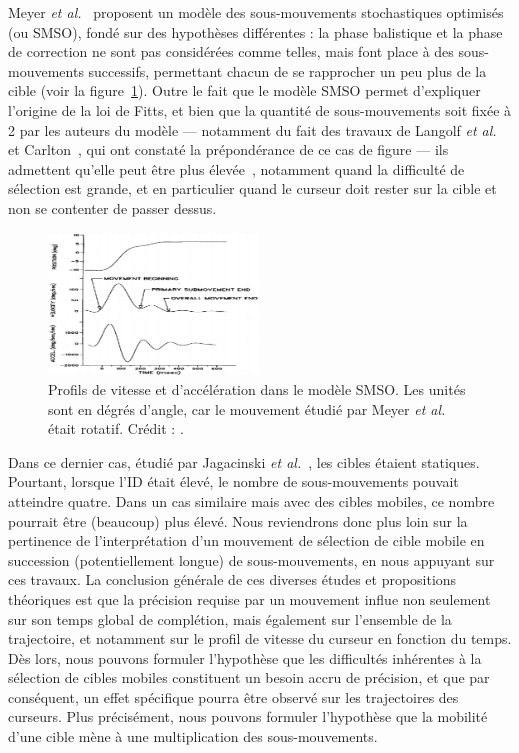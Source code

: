 	\label{sub:smso}
	Meyer \emph{et al.}~\cite{meyer1988optimality} proposent un modèle des \og sous-mouvements stochastiques optimisés \fg{} (ou SMSO), fondé sur des hypothèses différentes : la phase balistique et la phase de correction ne sont pas considérées comme telles, mais font place à des sous-mouvements successifs, permettant chacun de se rapprocher un peu plus de la cible (voir la figure~\ref{fig:meyer}). Outre le fait que le modèle SMSO permet d'expliquer l'origine de la loi de Fitts, et bien que la quantité de sous-mouvements soit fixée à 2 par les auteurs du modèle --- notamment du fait des travaux de Langolf \emph{et al.}~\cite{langolf1976investigation} et Carlton~\cite{carlton1979control}, qui ont constaté la prépondérance de ce cas de figure --- ils admettent qu'elle peut être plus élevée~\cite{crossman1963feedback, crossman1983feedback}, notamment quand la difficulté de sélection est grande, et en particulier quand le curseur doit rester sur la cible et non se contenter de passer dessus.
	
	\begin{figure}
		\centering
		\includegraphics[width=0.5\textwidth]{figures/ch2/meyer}
		\caption[Profils de vitesse et d'accélération dans le modèle SMSO]{Profils de vitesse et d'accélération dans le modèle SMSO. Les unités sont en dégrés d'angle, car le mouvement étudié par Meyer \emph{et al.} était rotatif. Crédit : \cite{meyer1988optimality}.}
		\label{fig:meyer}
	\end{figure}
	
	Dans ce dernier cas, étudié par Jagacinski \emph{et al.}~\cite{jagacinski1980fitts}, les cibles étaient statiques. Pourtant, lorsque l'ID était élevé, le nombre de sous-mouvements pouvait atteindre quatre. Dans un cas similaire mais avec des cibles mobiles, ce nombre pourrait être (beaucoup) plus élevé. Nous reviendrons donc plus loin sur la pertinence de l'interprétation d'un mouvement de sélection de cible mobile en succession (potentiellement longue) de sous-mouvements, en nous appuyant sur ces travaux. La conclusion générale de ces diverses études et propositions théoriques est que la précision requise par un mouvement influe non seulement sur son temps global de complétion, mais également sur l'ensemble de la trajectoire, et notamment sur le profil de vitesse du curseur en fonction du temps. Dès lors, nous pouvons formuler l'hypothèse que les difficultés inhérentes à la sélection de cibles mobiles constituent un besoin accru de précision, et que par conséquent, un effet spécifique pourra être observé sur les trajectoires des curseurs. Plus précisément, nous pouvons formuler l'hypothèse que la mobilité d'une cible mène à une multiplication des sous-mouvements.
	
